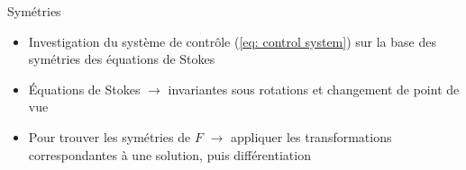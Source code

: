 \documentclass[10pt, envcountsect]{beamer}
\theoremstyle{plain}
\newcommand{\M}{\mathcal{M}}
\newcommand{\R}{\mathbb{R}}
\DeclareMathOperator{\SO}{SO}
\begin{document}
\begin{frame}{Symétries}
%
%
%

\begin{itemize}
\item Investigation du système de contrôle (\ref{eq: control system}) sur la base des symétries des équations de Stokes
\item Équations de Stokes $\to$ invariantes sous rotations et changement de point de vue
\item Pour trouver les symétries de $F$ $\to$ appliquer les transformations correspondantes à une solution, puis différentiation
\end{itemize}
\end{frame}
\end{document}
